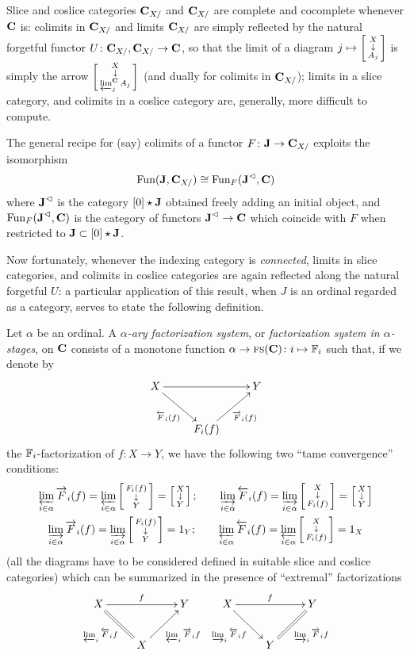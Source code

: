 \begin{remark}
Slice and coslice categories $\textbf{C}_{X/}$ and $\textbf{C}_{X/}$ are complete and cocomplete whenever $\textbf{C}$ is: colimits in $\textbf{C}_{X/}$ and limits $\textbf{C}_{X/}$ are simply reflected by the natural forgetful functor $U\colon \textbf{C}_{X/},\textbf{C}_{X/}\to \textbf{C}$, so that the limit of a diagram $j\mapsto \left[ \begin{smallmatrix} X \\ \downarrow \\ A_j \end{smallmatrix} \right]$ is simply the arrow $\left[ \begin{smallmatrix} X \\ \downarrow \\ \varprojlim_j^{\textbf{C}} A_j \end{smallmatrix} \right]$ (and dually for colimits in $\textbf{C}_{X/}$); limits in a slice category, and colimits in a coslice category are, generally, more difficult to compute.

The general recipe for (say) colimits of a functor $F\colon \textbf{J}\to \textbf{C}_{X/}$ exploits the isomorphism
\[
\text{Fun}(\textbf{J}, \textbf{C}_{X/})\cong \text{Fun}_F(\textbf{J}^\lhd, \textbf{C})
\]
where $\textbf{J}^\lhd$ is the category $[0]\star \textbf{J}$ obtained freely adding an initial object, and $\text{Fun}_F(\textbf{J}^\lhd, \textbf{C})$ is the category of functors $\textbf{J}^\lhd\to\textbf{C}$ which coincide with $F$ when restricted to $\textbf{J}\subset [0]\star \textbf{J}$.

Now fortunately, whenever the indexing category is \emph{connected}, limits in slice categories, and colimits in coslice categories are again reflected along the natural forgetful $U$: a particular application of this result, when $J$ is an ordinal regarded as a category, serves to state the following definition.
\end{remark}
\begin{definition}\label{mult.fs.trans}
Let $\alpha$ be an ordinal. A \emph{$\alpha$\hyp{}ary factorization system}, or \emph{factorization system in $\alpha$\hyp{}stages}, on $\textbf{C}$ consists of a monotone function $\alpha\to \textsc{fs}(\textbf{C})\colon i\mapsto \mathbb{F}_i$ such that, if we denote by
\[
\xymatrix{
X \ar[rr]\ar[dr]_{\overleftarrow{F}_i(f)}&& Y \\
& F_i(f)\ar[ur]_{\overrightarrow{F}_i(f)}
}
\]
the $\mathbb{F}_i$\hyp{}factorization of $f\colon X\to Y$, we have the following two ``tame convergence'' conditions:
\begin{gather*}
\varprojlim_{i\in\alpha} \overrightarrow{F}_i(f) =
\varprojlim_{i\in\alpha} \left[ \begin{smallmatrix} F_i(f) \\ \downarrow \\ Y \end{smallmatrix} \right] = \left[ \begin{smallmatrix} X \\ \downarrow \\ Y \end{smallmatrix} \right];
\qquad \varinjlim_{i\in\alpha} \overleftarrow{F}_i(f) =
\varinjlim_{i\in\alpha} \left[ \begin{smallmatrix} X \\ \downarrow \\ F_i(f) \end{smallmatrix} \right] = \left[ \begin{smallmatrix} X \\ \downarrow \\ Y \end{smallmatrix} \right]\\
\varinjlim_{i\in\alpha} \overrightarrow{F}_i(f) =
\varinjlim_{i\in\alpha} \left[ \begin{smallmatrix} F_i(f) \\ \downarrow \\ Y \end{smallmatrix} \right] = 1_Y;
\qquad \varprojlim_{i\in\alpha} \overleftarrow{F}_i(f) =
\varprojlim_{i\in\alpha} \left[ \begin{smallmatrix} X \\ \downarrow \\ F_i(f) \end{smallmatrix} \right] = 1_X
\end{gather*}
(all the diagrams have to be considered defined in suitable slice and coslice categories) which can be summarized in the presence of ``extremal'' factorizations
\[
\xymatrix{
X \ar[rr]^f\ar@{=}[dr]_{\varprojlim_i \overleftarrow{F}_if}&& Y & X\ar[rr]^f\ar[dr]_{\varinjlim_i \overleftarrow{F}_if} && Y\\
& X\ar[ur]_{\varprojlim_i \overrightarrow{F}_if} &&& Y\ar@{=}[ur]_{\varinjlim_i \overrightarrow{F}_if}
}
\]
\end{definition}
